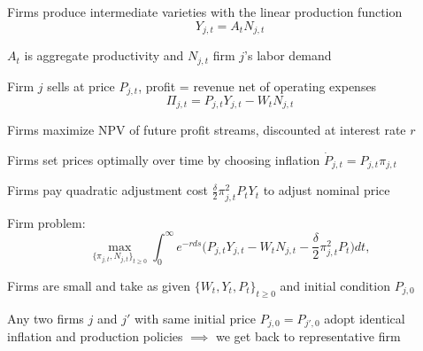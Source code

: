 \documentclass[11pt, aspectratio=169]{beamer}
\newenvironment{witemize}{\itemize\addtolength{\itemsep}{10pt}}{\enditemize}
\begin{document}
\begin{frame}{}
\begin{witemize}
\item Firms produce intermediate varieties with the linear production function 
\begin{equation*}
	Y_{j, t} = A_t N_{j, t}
\end{equation*}

\item $A_t$ is aggregate productivity and $N_{j, t}$ firm $j$'s labor demand 

\item Firm $j$ sells at price $P_{j, t}$, profit = revenue net of operating expenses
\begin{equation*}
	\Pi_{j, t} = P_{j, t} Y_{j, t} - W_t N_{j, t}
\end{equation*}

\item Firms maximize NPV of future profit streams, discounted at interest rate $r$
\end{witemize}
\end{frame}


\begin{frame}{}
\begin{witemize}
\item Firms set prices optimally over time by choosing inflation $\dot P_{j, t} = P_{j, t} \pi_{j, t}$
\item Firms pay quadratic adjustment cost $\frac{\delta}{2} \pi_{j, t}^2 P_t Y_t$ to adjust nominal price

\item Firm problem:
\begin{equation*}
	\max_{ \{ \pi_{j, t}, N_{j, t} \}_{t \geq 0} } \int_0^\infty e^{- r ds} \bigg( P_{j, t} Y_{j, t} - W_t N_{j, t} - \frac{\delta}{2} \pi_{j, t}^2 P_t \bigg) dt,
\end{equation*}

\item Firms are small and take as given $\{ W_t, Y_t, P_t \}_{t \geq 0}$ and initial condition $P_{j, 0}$

\item Any two firms $j$ and $j'$ with same initial price $P_{j, 0} = P_{j', 0}$ adopt identical inflation and production policies $\implies$ we get back to representative firm

\end{witemize}
\end{frame}
\end{document}
